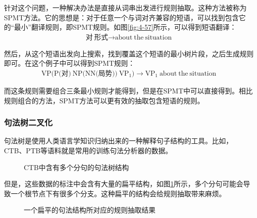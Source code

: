 \parinterval 针对这个问题，一种解决办法是直接从词串出发进行规则抽取。这种方法被称为SPMT方法\cite{marcu2006spmt:}。它的思想是：对于任意一个与词对齐兼容的短语，可以找到包含它的``最小''翻译规则，即SPMT规则。如图\ref{fig:4-57}所示，可以得到短语翻译：
\begin{eqnarray}
\textrm{对}\ \textrm{形式} \rightarrow \textrm{about}\ \textrm{the}\ \textrm{situation} \nonumber
\end{eqnarray}

\parinterval 然后，从这个短语出发向上搜索，找到覆盖这个短语的最小树片段，之后生成规则即可。在这个例子中可以得到SPMT规则：
\begin{eqnarray}
\textrm{VP(P(对)}\ \textrm{NP(NN(局势))}\ \textrm{VP}_1) \rightarrow \textrm{VP}_1\ \textrm{about}\ \textrm{the}\ \textrm{situation} \nonumber
\end{eqnarray}

\parinterval 而这条规则需要组合三条最小规则才能得到，但是在SPMT中可以直接得到。相比规则组合的方法，SPMT方法可以更有效的抽取包含短语的规则。


\subsubsection{句法树二叉化}

\parinterval 句法树是使用人类语言学知识归纳出来的一种解释句子结构的工具。比如， CTB\cite{xue2005building}、PTB\cite{DBLP:journals/coling/MarcusSM94}等语料就是常用的训练句法分析器的数据。

\begin{figure}[htp]
\centering

\caption{CTB中含有多个分句的句法树结构}
\label{fig:4-58}
\end{figure}

\parinterval 但是，这些数据的标注中会含有大量的扁平结构，如图\ref{fig:4-58}所示，多个分句可能会导致一个根节点下有很多个分支。这种扁平的结构会给规则抽取带来麻烦。

\begin{figure}[htp]
\centering

\caption{一个扁平的句法结构所对应的规则抽取结果}
\label{fig:4-59}
\end{figure}

